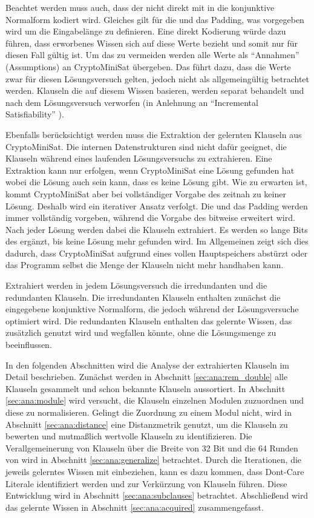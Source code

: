 Beachtet werden muss auch, dass der  nicht direkt mit in die konjunktive Normalform kodiert wird. Gleiches gilt für die 
und das Padding, was vorgegeben wird um die Eingabelänge zu definieren. Eine direkt Kodierung würde dazu führen, dass erworbenes Wissen
sich auf diese Werte bezieht und somit nur für diesen Fall gültig ist. Um das zu vermeiden werden alle Werte als "`Annahmen"' (Assumptions)
an CryptoMiniSat übergeben. Das führt dazu, dass die Werte zwar für diesen Lösungsversuch gelten, jedoch nicht als allgemeingültig betrachtet
werden. Klauseln die auf diesem Wissen basieren, werden separat behandelt und nach dem Lösungsversuch verworfen (in Anlehnung an
"`Incremental Satisfiability"' \cite[Kapitel 6]{shtrichman}).

Ebenfalls berücksichtigt werden muss die Extraktion der gelernten Klauseln aus CryptoMiniSat. Die internen Datenstrukturen sind nicht dafür
geeignet, die Klauseln während eines laufenden Lösungsversuchs zu extrahieren. Eine Extraktion kann nur erfolgen, wenn CryptoMiniSat eine
Lösung gefunden hat wobei die Lösung auch sein kann, dass es keine Lösung gibt. Wie zu erwarten ist, kommt CryptoMiniSat aber bei vollständiger
Vorgabe des  zeitnah zu keiner Lösung. Deshalb wird ein iterativer Ansatz verfolgt. Die  und das Padding werden immer vollständig vorgeben,
während die Vorgabe des  bitweise erweitert wird. Nach jeder Lösung werden dabei die Klauseln extrahiert. Es werden so lange Bits des 
ergänzt, bis keine Lösung mehr gefunden wird. Im Allgemeinen zeigt sich dies dadurch, dass CryptoMiniSat aufgrund eines vollen Hauptspeichers
abstürzt oder das Programm selbst die Menge der Klauseln nicht mehr handhaben kann.

Extrahiert werden in jedem Lösungsversuch die irredundanten und die redundanten Klauseln. Die irredundanten Klauseln enthalten zunächst die
eingegebene konjunktive Normalform, die jedoch während der Lösungsversuche optimiert wird. Die redundanten Klauseln enthalten das gelernte
Wissen, das zusätzlich genutzt wird und wegfallen könnte, ohne die Lösungsmenge zu beeinflussen.

In den folgenden Abschnitten wird die Analyse der extrahierten Klauseln im Detail beschrieben. Zunächst werden in Abschnitt \ref{sec:ana:rem_double}
alle Klauseln gesammelt und schon bekannte Klauseln aussortiert. In Abschnitt \ref{sec:ana:module} wird versucht, die Klauseln einzelnen Modulen
zuzuordnen und diese zu normalisieren. Gelingt die Zuordnung zu einem Modul nicht, wird in Abschnitt \ref{sec:ana:distance} eine Distanzmetrik
genutzt, um die Klauseln zu bewerten und mutmaßlich wertvolle Klauseln zu identifizieren. Die Verallgemeinerung von Klauseln über die Breite von
32 Bit und die 64 Runden von  wird in Abschnitt \ref{sec:ana:generalize} betrachtet. Durch die Iterationen, die jeweils gelerntes Wissen mit
einbeziehen, kann es dazu kommen, dass Dont-Care Literale identifiziert werden und zur Verkürzung von Klauseln führen. Diese Entwicklung wird in
Abschnitt \ref{sec:ana:subclauses} betrachtet. Abschließend wird das gelernte Wissen in Abschnitt \ref{sec:ana:acquired} zusammengefasst.






